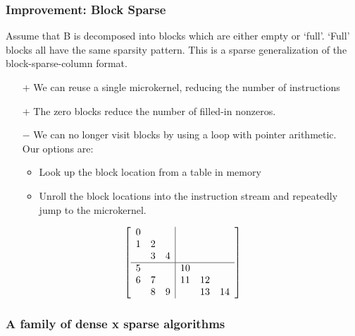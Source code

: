 \documentclass[9pt]{beamer}
\begin{document}
\begin{frame}[fragile]
  \frametitle{Improvement: Block Sparse}
  Assume that B is decomposed into blocks which are either empty or `full'. `Full' blocks all have the same sparsity pattern. This is a sparse generalization of the block-sparse-column format.

  \begin{itemize}
  \item[$+$] We can reuse a single microkernel, reducing the number of instructions
  \item[$+$] The zero blocks reduce the number of filled-in nonzeros.
  \item[$-$] We can no longer visit blocks by using a loop with pointer arithmetic. \\Our options are:
    \begin{itemize}
    \item Look up the block location from a table in memory
    \item Unroll the block locations into the instruction stream and repeatedly jump to the microkernel.
    \end{itemize}
  \end{itemize}


      \[
      \left[
          \begin{array}{c c c | c c c }
          0 &   &   &    &    &    \\
          1 & 2 &   &    &    &    \\
            & 3 & 4 &    &    &    \\
          \hline
          5 &   &   & 10 &    &    \\
          6 & 7 &   & 11 & 12 &    \\
            & 8 & 9 &    & 13 & 14 \\
          \end{array}
          \right]
      \]
\end{frame}

\begin{frame}
  \frametitle{A family of dense x sparse algorithms}
  
\end{frame}
\end{document}

